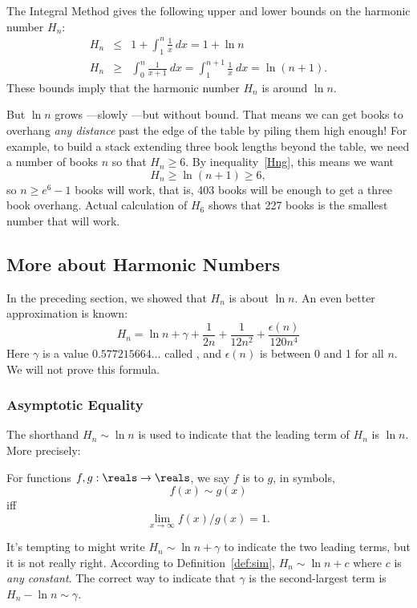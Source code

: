 The Integral Method gives the following upper and lower bounds on the
harmonic number $H_n$:
\begin{eqnarray}
H_n & \leq & 1 + \int_1^n \frac{1}{x} \ dx = 1 + \ln n \label{Hnl}\\
H_n & \geq & \int_0^n \frac{1}{x+1} \ dx = \int_1^{n+1} \frac{1}{x} \ dx = \ln(n+1).\label{Hng}
\end{eqnarray}
These bounds imply that the harmonic number $H_n$ is around $\ln n$.

But $\ln n$ grows ---slowly ---but without bound.  That means we can get
books to overhang \emph{any distance} past the edge of the table by piling
them high enough!  For example, to build a stack extending three book
lengths beyond the table, we need a number of books $n$ so that $H_n \ge
6$.  By inequality~\eqref{Hng}, this means we want
\[
H_n \geq \ln(n+1) \geq 6,
\]
so $n \geq e^6-1$ books will work, that is, 403 books will be enough to
get a three book overhang.  Actual calculation of $H_6$ shows that 227
books is the smallest number that will work.

\subsection{More about Harmonic Numbers}

In the preceding section, we showed that $H_n$ is about $\ln n$.  An
even better approximation is known:
\[
H_n = \ln n + \gamma + \frac{1}{2n} + \frac{1}{12n^2} +
        \frac{\epsilon(n)}{120n^4}
\]
Here $\gamma$ is a value $0.577215664\dots$ called , and $\epsilon(n)$ is between 0 and 1 for all $n$.  We will
not prove this formula.

\subsubsection{Asymptotic Equality}
The shorthand $H_n \sim \ln n$ is used to indicate that the leading
term of $H_n$ is $\ln n$.  More precisely:
\begin{definition}\label{def:sim}
  For functions $f,g: \reals \to \reals$, we say $f$ is  to $g$, in symbols,
\[
f(x) \sim g(x)
\]
iff
\[
\lim_{x \rightarrow \infty} f(x)/g(x) = 1.
\]
\end{definition}

It's tempting to might write $H_n \sim \ln n + \gamma$ to indicate the two
leading terms, but it is not really right.  According to
Definition~\ref{def:sim}, $H_n \sim \ln n + c$ where $c$ is \emph{any
  constant}.  The correct way to indicate that $\gamma$ is the
second-largest term is $H_n - \ln n \sim \gamma$.

